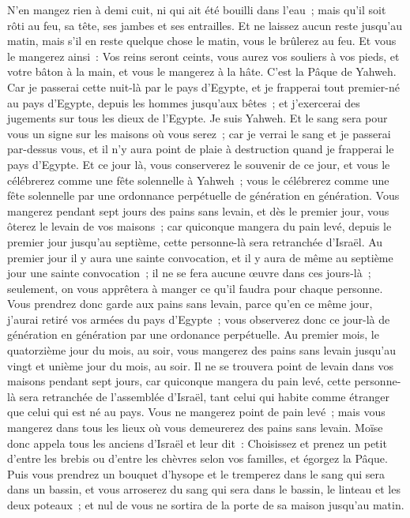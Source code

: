 \begin{multicols}{2}
N'en mangez rien à demi cuit, ni qui ait été bouilli dans l'eau~; mais qu'il soit rôti au feu, sa tête, ses jambes et ses entrailles.
 Et ne laissez aucun reste jusqu'au matin, mais s'il en reste quelque chose le matin, vous le brûlerez au feu.
Et vous le mangerez ainsi~: Vos reins seront ceints, vous aurez vos souliers à vos pieds, et votre bâton à la main, et vous le mangerez à la hâte. C'est la Pâque de Yahweh.
Car je passerai cette nuit-là par le pays d'Egypte, et je frapperai tout premier-né au pays d'Egypte, depuis les hommes jusqu'aux bêtes~; et j'exercerai des jugements sur tous les dieux de l'Egypte. Je suis Yahweh.
Et le sang sera pour vous un signe sur les maisons où vous serez~; car je verrai le sang et je passerai par-dessus vous, et il n'y aura point de plaie à destruction quand je frapperai le pays d'Egypte.
Et ce jour là, vous conserverez le souvenir de ce jour, et vous le célébrerez comme une fête solennelle à Yahweh~; vous le célébrerez comme une fête solennelle par une ordonnance perpétuelle de génération en génération.
Vous mangerez pendant sept jours des pains sans levain, et dès le premier jour, vous ôterez le levain de vos maisons~; car quiconque mangera du pain levé, depuis le premier jour jusqu'au septième, cette personne-là sera retranchée d'Israël.
Au premier jour il y aura une sainte convocation, et il y aura de même au septième jour une sainte convocation~; il ne se fera aucune œuvre dans ces jours-là~; seulement, on vous apprêtera à manger ce qu'il faudra pour chaque personne.
Vous prendrez donc garde aux pains sans levain, parce qu'en ce même jour, j'aurai retiré vos armées du pays d'Egypte~; vous observerez donc ce jour-là de génération en génération par une ordonance perpétuelle.
Au premier mois, le quatorzième jour du mois, au soir, vous mangerez des pains sans levain jusqu'au vingt et unième jour du mois, au soir.
Il ne se trouvera point de levain dans vos maisons pendant sept jours, car quiconque mangera du pain levé, cette personne-là sera retranchée de l'assemblée d'Israël, tant celui qui habite comme étranger que celui qui est né au pays.
Vous ne mangerez point de pain levé~; mais vous mangerez dans tous les lieux où vous demeurerez des pains sans levain.
Moïse donc appela tous les anciens d'Israël et leur dit~: Choisissez et prenez un petit d'entre les brebis ou d'entre les chèvres selon vos familles, et égorgez la Pâque.
Puis vous prendrez un bouquet d'hysope et le tremperez dans le sang qui sera dans un bassin, et vous arroserez du sang qui sera dans le bassin, le linteau et les deux poteaux~; et nul de vous ne sortira de la porte de sa maison jusqu'au matin.

\end{multicols}
